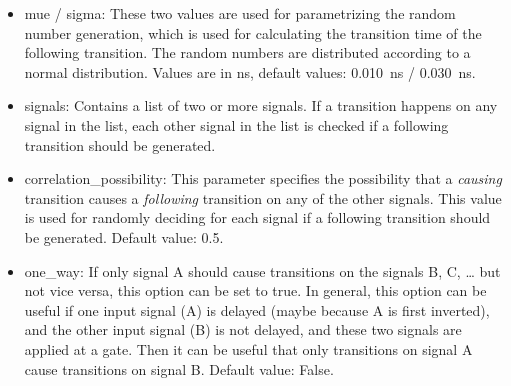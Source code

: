 \begin{itemize}
  \begin{itemize}
  \item
    mue / sigma: These two values are used for parametrizing the random
    number generation, which is used for calculating the transition time
    of the following transition. The random numbers are distributed
    according to a normal distribution. Values are in \si{\ns}, default values: 
    \SI{0.010}{\ns} / \SI{0.030}{\ns}.
  \item
    signals: Contains a list of two or more signals. If a transition
    happens on any signal in the list, each other signal in the list is
    checked if a following transition should be generated.
  \item
    correlation\_possibility: This parameter specifies the possibility
    that a \emph{causing} transition causes a \emph{following} transition on
    any of the other signals. This value is used for randomly deciding
    for each signal if a following transition should be generated. Default 
    value: 0.5.
  \item
    one\_way: If only signal A should cause transitions on the signals
    B, C, \ldots{} but not vice versa, this option can be set to true.
    In general, this option can be useful if one input signal (A) is
    delayed (maybe because A is first inverted), and the other input
    signal (B) is not delayed, and these two signals are applied at a
    gate. Then it can be useful that only transitions on signal A cause
    transitions on signal B. Default value: False.
  \end{itemize}
\end{itemize}
